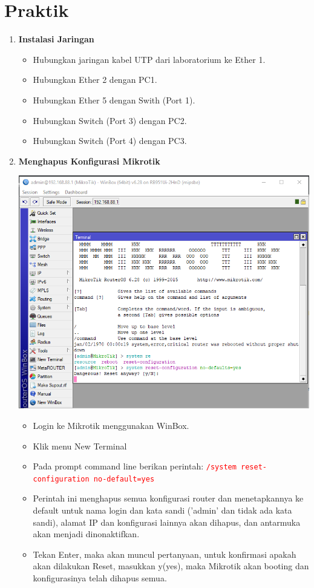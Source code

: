 \documentclass[a4paper,12pt]{article}
\begin{document}
\section{Praktik}
\begin{enumerate}[label=\textbf{\arabic*.}]
    \item \textbf{Instalasi Jaringan\\}
        \begin{itemize}
            \item Hubungkan jaringan kabel UTP dari laboratorium ke Ether 1.
            \item Hubungkan Ether 2 dengan PC1.
            \item Hubungkan Ether 5 dengan Swith (Port 1).
            \item Hubungkan Switch (Port 3) dengan PC2.
            \item Hubungkan Switch (Port 4) dengan PC3.
        \end{itemize}

    \item \textbf{Menghapus Konfigurasi Mikrotik\\}
        \begin{center}
            \includegraphics[width = 0.8\linewidth]{image1.png}
        \end{center}
        \begin{itemize}
            \item Login ke Mikrotik menggunakan WinBox.
            \item Klik menu New Terminal
            \item Pada prompt command line berikan perintah: \textcolor{red}{\texttt{/system reset-configuration no-default=yes}}
            \item Perintah ini menghapus semua konfigurasi router dan menetapkannya ke default untuk nama login dan kata sandi ('admin' dan tidak ada kata sandi), alamat IP dan konfigurasi lainnya akan dihapus, dan antarmuka akan menjadi dinonaktifkan.
            \item Tekan Enter, maka akan muncul pertanyaan, untuk konfirmasi apakah akan dilakukan Reset, masukkan y(yes), maka Mikrotik akan booting dan konfigurasinya telah dihapus semua.


\end{itemize}
\end{enumerate}
\end{document}
